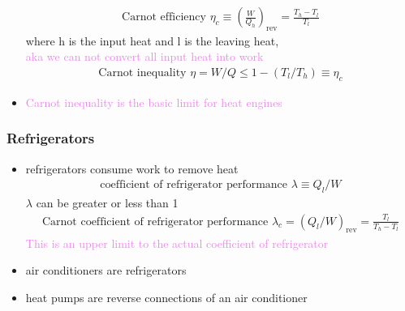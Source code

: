 \begin{itemize}
\begin{align}
		      \text{Carnot efficiency } \eta_c \equiv (\frac{W}{Q_h})_\text{rev} = \frac{T_h - T_l}{T_l}
	      \end{align}
	      where h is the input heat and l is the leaving heat, \\
	      \textcolor{violet}{aka we can not convert all input heat into work}
	      \begin{align}
		      \text{Carnot inequality } \eta = W/Q \leq 1 - (T_l/T_h) \equiv \eta_c
	      \end{align}
	\item \textcolor{violet}{Carnot inequality is the basic limit for heat engines}
\end{itemize}


\subsubsection{Refrigerators}
\begin{itemize}
	\item refrigerators consume work to remove heat
	      \begin{align}
		      \text{coefficient of refrigerator performance } \lambda \equiv Q_l /W
	      \end{align}
	      $\lambda$ can be greater or less than 1
	      \begin{align}
		      \text{Carnot coefficient of refrigerator performance } \lambda_c = (Q_l/W)_\text{rev} = \frac{T_l}{T_h - T_l}
	      \end{align}
	      \textcolor{violet}{This is an upper limit to the actual coefficient of refrigerator}
	\item air conditioners are refrigerators
	\item heat pumps are reverse connections of an air conditioner
\end{itemize}


